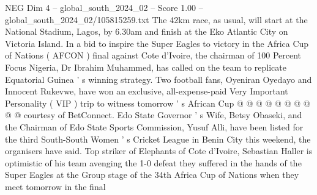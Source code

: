 \begin{textsample}{NEG Dim 4 – global\_south\_2024\_02 – Score 1.00 – global\_south\_2024\_02/105815259.txt}
The 42km race, as usual, will start at the National Stadium, Lagos, by 6.30am and finish at the Eko Atlantic City on Victoria Island.
In a bid to inspire the Super Eagles to victory in the Africa Cup of Nations ( AFCON ) final against Cote d'Ivoire, the chairman of 100 Percent Focus Nigeria, Dr Ibrahim Muhammed, has called on the team to replicate Equatorial Guinea ' s winning strategy.
Two football fans, Oyeniran Oyedayo and Innocent Rukevwe, have won an exclusive, all-expense-paid Very Important Personality ( VIP ) trip to witness tomorrow ' s African Cup @ @ @ @ @ @ @ @ @ @ courtesy of BetConnect.
Edo State Governor ' s Wife, Betsy Obaseki, and the Chairman of Edo State Sports Commission, Yusuf Alli, have been listed for the third South-South Women ' s Cricket League in Benin City this weekend, the organisers have said.
Top striker of Elephants of Cote d'Ivoire, Sebastian Haller is optimistic of his team avenging the 1-0 defeat they suffered in the hands of the Super Eagles at the Group stage of the 34th Africa Cup of Nations when they meet tomorrow in the final

\end{textsample}

